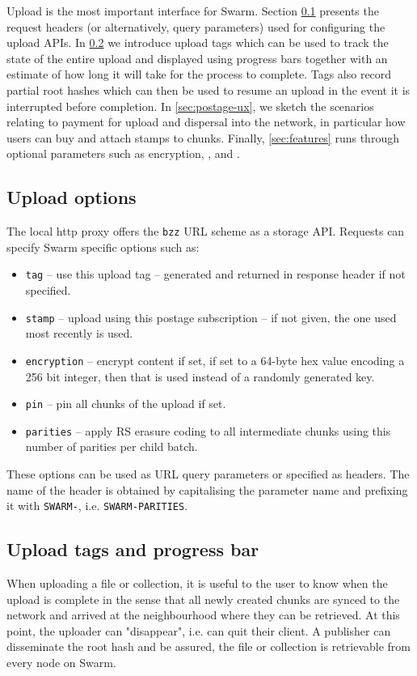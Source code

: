 \green{}

Upload is the most important interface for Swarm. Section \ref{sec:headers} presents the request headers (or alternatively, query parameters) used for configuring the upload APIs. In \ref{sec:tags} we introduce upload tags which can be used to track the state of the entire upload and displayed using progress bars together with an estimate of how long it will take for the process to complete. Tags also record partial root hashes which can then be used to resume an upload in the event it is interrupted before completion. In \ref{sec:postage-ux}, we sketch the scenarios relating to payment for upload and dispersal into the network, in particular how users can buy and attach stamps to chunks. Finally, \ref{sec:features} runs through optional parameters such as encryption, , and .

\subsection{Upload options \statusgreen}\label{sec:headers}

The local http proxy offers the \lstinline{bzz} URL scheme as a storage API. Requests can specify Swarm specific options such as:

\begin{itemize}[noitemsep]
\item \lstinline{tag} -- use this upload tag -- generated and returned in response header if not specified. 
\item \lstinline{stamp} -- upload using this postage subscription -- if not given, the one used most recently is used. 
\item \lstinline{encryption} -- encrypt content if set, if set to a 64-byte hex value encoding a 256 bit integer, then that is used instead of a randomly generated key. 
\item \lstinline{pin} -- pin all chunks of the upload if set. 
\item \lstinline{parities} -- apply RS erasure coding to all intermediate chunks using this number of parities per child batch.
\end{itemize}

These options can be used as URL query parameters or specified as  headers. The name of the header is obtained by capitalising the parameter name and prefixing it with \lstinline{SWARM-},  i.e. \lstinline{SWARM-PARITIES}.  


\subsection{Upload tags and progress bar \statusgreen}\label{sec:tags}                                                                                        
When uploading a file or collection, it is useful to the user to know when the upload is complete in the sense that all newly created chunks are synced to the network and arrived at the neighbourhood where they can be retrieved. At this point, the uploader can "disappear", i.e. can quit their client. A publisher can disseminate the root hash and be assured, the file or collection is retrievable from every node on Swarm. 

